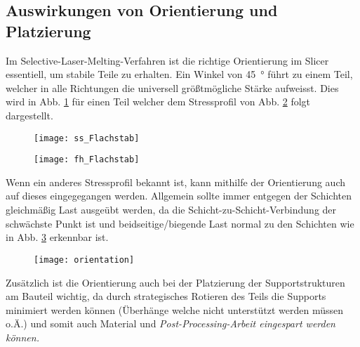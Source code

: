 \documentclass[../main.tex]{subfiles}
\begin{document}
\subsection{Auswirkungen von Orientierung und Platzierung}
Im Selective-Laser-Melting-Verfahren ist die richtige Orientierung im Slicer essentiell, um stabile Teile zu erhalten.
Ein Winkel von \qty{45}{\degree} führt zu einem Teil, welcher in alle Richtungen die universell größtmögliche Stärke aufweisst. Dies wird in Abb. \ref{img:ss_1} für einen Teil welcher dem Stressprofil von Abb. \ref{img:fh_1} folgt dargestellt. 
\begin{figure}[H]
	\centering
	\texttt{[image: ss\_Flachstab]}
	\label{img:ss_1}
\end{figure}
\begin{figure}[H]
	\centering
	\texttt{[image: fh\_Flachstab]}
	\label{img:fh_1}
\end{figure}

Wenn ein anderes Stressprofil bekannt ist, kann mithilfe der Orientierung auch auf dieses eingegegangen werden. Allgemein sollte immer entgegen der Schichten gleichmäßig Last ausgeübt werden, da die Schicht-zu-Schicht-Verbindung der schwächste Punkt ist und beidseitige/biegende Last normal zu den Schichten wie in Abb. \ref{img:orient_1} erkennbar ist.

\begin{figure}[H]
	\centering
	\texttt{[image: orientation]}
	\label{img:orient_1}
\end{figure}
Zusätzlich ist die Orientierung auch bei der Platzierung der Supportstrukturen am Bauteil wichtig, da durch strategisches Rotieren des Teils die Supports minimiert werden können (Überhänge welche nicht unterstützt werden müssen o.Ä.) und somit auch Material und \it{Post-Processing}-Arbeit eingespart werden können. 
\end{document}
